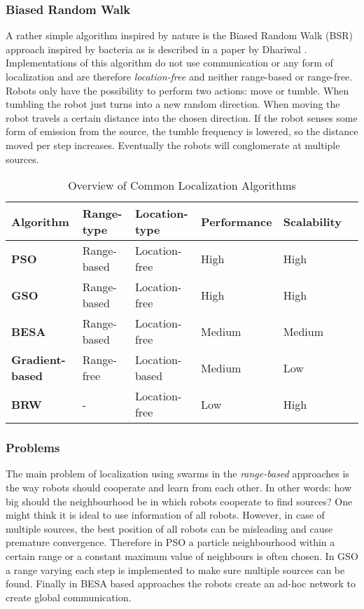 	\subsubsection{Biased Random Walk}
		A rather simple algorithm inspired by nature is the Biased Random Walk (BSR) approach inspired by bacteria as is described in a paper by Dhariwal \cite{dhariwal2004bacterium}.
		Implementations of this algorithm do not use communication or any form of localization and are therefore \emph{location-free} and neither range-based or range-free.
		Robots only have the possibility to perform two actions: move or tumble. 
		When tumbling the robot just turns into a new random direction. 
		When moving the robot travels a certain distance into the chosen direction. 
		If the robot senses some form of emission from the source, the tumble frequency is lowered, so the distance moved per step increases.
		Eventually the robots will conglomerate at multiple sources.

	\begin{table}[H]
  \renewcommand{\arraystretch}{1.3}
  \caption{Overview of Common Localization Algorithms}
  \label{table_alg_localization}
  \centering
    \begin{tabular}{|l|l|l|l|l|l|}
    \hline
    \bfseries Algorithm & \bfseries Range-type & \bfseries Location-type & \bfseries Performance & \bfseries Scalability\\
    \hline
    \bfseries PSO & Range-based & Location-free & High & High\\
    \hline
    \bfseries GSO & Range-based & Location-free & High & High\\
    \hline
    \bfseries BESA & Range-based & Location-free & Medium & Medium\\
    \hline
    \bfseries Gradient-based & Range-free & Location-based & Medium & Low\\
    \hline
    \bfseries BRW & - & Location-free & Low & High\\
    \hline
    \end{tabular}
  \end{table}

	\subsubsection{Problems}
	The main problem of localization using swarms in the \emph{range-based} approaches is the way robots should cooperate and learn from each other. 
	In other words: how big should the neighbourhood be in which robots cooperate to find sources? 
	One might think it is ideal to use information of all robots.
	However, in case of multiple sources, the best position of all robots can be misleading and cause premature convergence. 
	Therefore in PSO a particle neighbourhood within a certain range or a constant maximum value of neighbours is often chosen. 
	In GSO a range varying each step is implemented to make sure multiple sources can be found.
	Finally in BESA based approaches the robots create an ad-hoc network to create global communication. 


